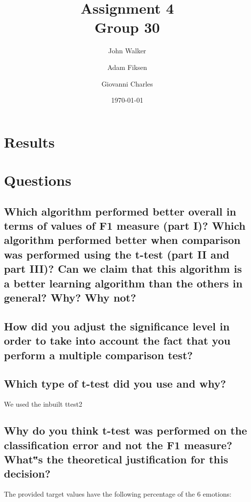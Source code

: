 \documentclass[11pt]{article}
\begin{document}
\title{Assignment 4 \\ Group 30  }

\author{John Walker \and Adam Fiksen \and Giovanni Charles }

\date{\today}         %

\maketitle           %



\section{Results}

\section{Questions}
\subsection{Which algorithm performed better overall in terms of values of F1 measure (part I)? Which algorithm performed better when comparison was performed using the t-test (part II and part III)? Can we claim that this algorithm is a better learning algorithm than the others in general? Why? Why not?}

\subsection{How did you adjust the significance level in order to take into account the fact that you perform a multiple comparison test?}

\subsection{Which type of t-test did you use and why?}

We used the inbuilt ttest2

\subsection{Why do you think t-test was performed on the classification error and not the F1 measure? What‟s the theoretical justification for this decision?}

The provided target values have the following percentage of the 6 emotions:
\end{document}
